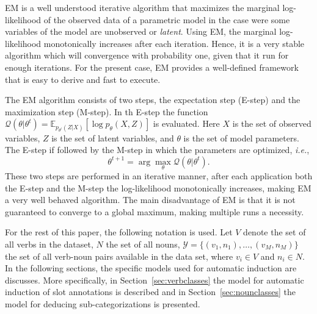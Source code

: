 \documentclass[11pt]{scrartcl}
\newcommand{\ie}{\textit{i.e.}}
\begin{document}
EM is a well understood iterative algorithm that maximizes the
marginal log-likelihood of the observed data of a parametric model in
the case were some variables of the model are unobserved or
\textit{latent}. Using EM, the marginal log-likelihood monotonically
increases after each iteration. Hence, it is a very stable algorithm
which will convergence with probability one, given that it run for
enough iterations. For the present case, EM provides a well-defined
framework that is easy to derive and fast to execute.

The EM algorithm consists of two steps, the expectation step (E-step)
and the maximization step (M-step). In th E-step the function
$\mathcal{Q}(\theta|\theta^t) =
\mathbb{E}_{p_{\theta^t}(Z|X)}[\log p_{\theta}(X, Z)]$ is evaluated. Here 
$X$ is the set of observed variables, $Z$ is the set of latent
variables, and $\theta$ is the set of model parameters. The E-step if
followed by the M-step in which the parameters are optimized, \ie,
\[
  \theta^{t+1} = \arg\max_{\theta} \mathcal{Q}(\theta | \theta^t).
\]
These two steps are performed in an iterative manner, after each
application both the E-step and the M-step the log-likelihood
monotonically increases, making EM a very well behaved algorithm. The
main disadvantage of EM is that it is not guaranteed to converge to
a global maximum, making multiple runs a necessity.

For the rest of this paper, the following notation is used. Let $V$
denote the set of all verbs in the dataset, $N$
the set of all nouns, $\mathcal{Y} = \{(v_1, n_1), \ldots, (v_M,
n_M)\}$ the set of all verb-noun pairs available in the data set, where
$v_i \in V$ and $n_i \in N$. In the following sections, the specific
models used for automatic induction are discusses. More specifically,
in Section~\ref{sec:verbclasses} the model for automatic induction of
slot annotations is described and in Section~\ref{sec:nounclasses} the
model for deducing sub-categorizations is presented.
\end{document}
